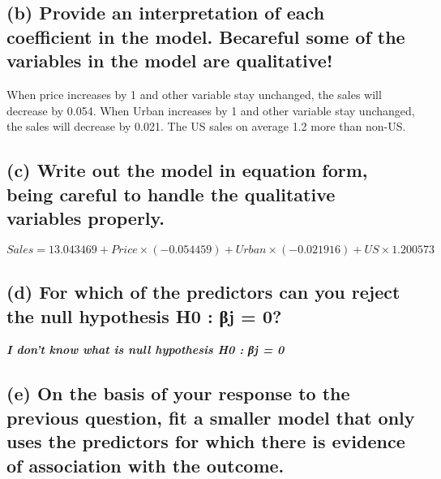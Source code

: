 \documentclass[
]{article}
\begin{document}
\hypertarget{b-provide-an-interpretation-of-each-coefficient-in-the-model.-becareful-some-of-the-variables-in-the-model-are-qualitative}{%
\subsection{(b) Provide an interpretation of each coefficient in the
model. Becareful some of the variables in the model are
qualitative!}\label{b-provide-an-interpretation-of-each-coefficient-in-the-model.-becareful-some-of-the-variables-in-the-model-are-qualitative}}

When price increases by 1 and other variable stay unchanged, the sales
will decrease by 0.054. When Urban increases by 1 and other variable
stay unchanged, the sales will decrease by 0.021. The US sales on
average 1.2 more than non-US.

\hypertarget{c-write-out-the-model-in-equation-form-being-careful-to-handle-the-qualitative-variables-properly.}{%
\subsection{(c) Write out the model in equation form, being careful to
handle the qualitative variables
properly.}\label{c-write-out-the-model-in-equation-form-being-careful-to-handle-the-qualitative-variables-properly.}}

\(Sales = 13.043469 + Price \times(-0.054459)+ Urban \times (-0.021916) + US \times 1.200573\)

\hypertarget{d-for-which-of-the-predictors-can-you-reject-the-null-hypothesis-h0-ux3b2j-0}{%
\subsection{(d) For which of the predictors can you reject the null
hypothesis H0 : βj =
0?}\label{d-for-which-of-the-predictors-can-you-reject-the-null-hypothesis-h0-ux3b2j-0}}

\textbf{\emph{I don't know what is null hypothesis H0 : βj = 0}}

\hypertarget{e-on-the-basis-of-your-response-to-the-previous-question-fit-a-smaller-model-that-only-uses-the-predictors-for-which-there-is-evidence-of-association-with-the-outcome.}{%
\subsection{(e) On the basis of your response to the previous question,
fit a smaller model that only uses the predictors for which there is
evidence of association with the
outcome.}\label{e-on-the-basis-of-your-response-to-the-previous-question-fit-a-smaller-model-that-only-uses-the-predictors-for-which-there-is-evidence-of-association-with-the-outcome.}}
\end{document}
